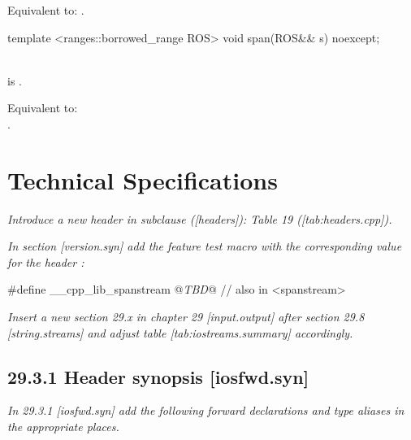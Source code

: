 \documentclass[ebook,11pt,article]{memoir}
\begin{document}
\begin{itemdescr}
\pnum
\effects
Equivalent to:
.
\end{itemdescr}

\begin{addedblock}
\begin{itemdecl}
template <ranges::borrowed_range ROS>
void span(ROS&& s) noexcept;
\end{itemdecl}

\begin{itemdescr}
\pnum
\constraints
{}\\  is .
 
\pnum
\effects
Equivalent to: \\
.
\end{itemdescr}

\end{addedblock}

\chapter{Technical Specifications}

\emph{Introduce a new header  in subclause ([headers]): Table 19 ([tab:headers.cpp]).}

\emph{In section [version.syn] add the feature test macro  
with the corresponding value for the header :}
\begin{codeblock}
#define __cpp_lib_spanstream  @\emph{TBD}@ // also in <spanstream>
\end{codeblock}

\emph{Insert a new section 29.x in chapter 29 [input.output] after section 29.8 [string.streams] and adjust table [tab:iostreams.summary] accordingly.}


\section{29.3.1 Header  synopsis [iosfwd.syn]}

\emph{In 29.3.1 [iosfwd.syn] add the following forward declarations and type aliases in the appropriate places.}
\end{document}
